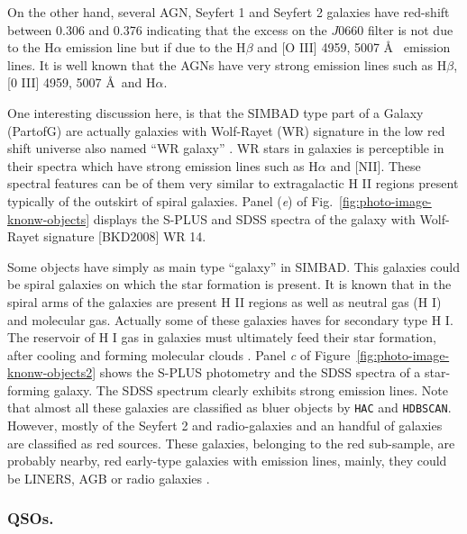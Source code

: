 \documentclass[fleqn,usenatbib]{mnras}
\begin{document}
On the other hand, several AGN, Seyfert 1 and Seyfert 2 galaxies have red-shift 
between 0.306 and 0.376 indicating that the excess on the $J0660$ filter
is not due to the H{$\alpha$} emission line but if due to the H{$\beta$} 
and [O III] 4959, 5007 \AA~ emission lines. %
It is well known that the AGNs have very strong emission 
lines such as H{$\beta$}, [0 III] 4959, 5007 \AA~and H{$\alpha$}. 

One interesting discussion here, is that the SIMBAD type part of a Galaxy (PartofG)
 are actually galaxies with Wolf-Rayet (WR) signature in the low red shift
universe also named ``WR galaxy'' \citep{Osterbrock:1982}. WR stars in galaxies
is perceptible in their spectra which have strong emission lines such as H{$\alpha$}
and [NII]. These spectral features can be of them very similar to extragalactic
H II regions present typically of the outskirt of spiral galaxies. Panel (\textit{e}) 
of Fig.~\ref{fig:photo-image-knonw-objects} displays the S-PLUS and SDSS spectra 
of the galaxy with Wolf-Rayet signature [BKD2008] WR 14.

Some objects have simply as main type ``galaxy'' in SIMBAD.
This galaxies could be spiral galaxies on which the star formation is present. 
It is known that in the spiral arms of the galaxies are present H II regions 
as well as neutral gas (H I) and molecular gas. Actually some of these galaxies 
haves for secondary type H I. The reservoir of H I gas in galaxies must ultimately
feed their star formation, after cooling and forming molecular
clouds \citep{van-Driel:2016}. Panel \textit{c} of Figure~\ref{fig:photo-image-knonw-objects2} 
shows the S-PLUS photometry and the SDSS spectra of a star-forming galaxy. The SDSS spectrum 
clearly exhibits strong emission lines. Note that almost all these galaxies are 
classified as bluer objects by \texttt{HAC} and \texttt{HDBSCAN}.
However, mostly of the Seyfert 2 and radio-galaxies and an handful of 
galaxies are classified as red sources. 
These galaxies, belonging to the red sub-sample, are probably nearby, 
red early-type galaxies with emission lines, mainly, they could be LINERS, 
AGB or radio galaxies \citep{Capetti:2011}.

\subsubsection{QSOs.}
\end{document}
